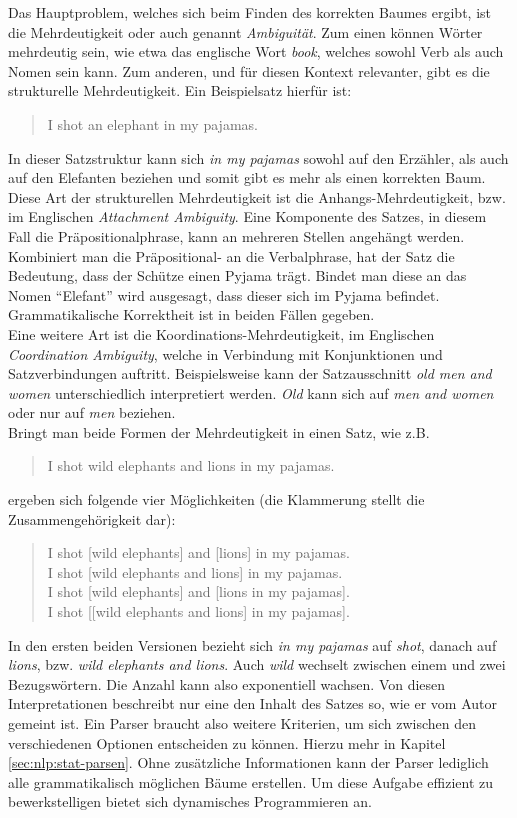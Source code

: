 Das Hauptproblem, welches sich beim Finden des korrekten Baumes ergibt, ist die Mehrdeutigkeit oder auch genannt \textit{Ambiguität}. Zum einen können Wörter mehrdeutig sein, wie etwa das englische Wort \textit{book}, welches sowohl Verb als auch Nomen sein kann. Zum anderen, und für diesen Kontext relevanter, gibt es die strukturelle Mehrdeutigkeit. Ein Beispielsatz hierfür ist: 
\begin{quote}
I shot an elephant in my pajamas.
\end{quote}
In dieser Satzstruktur kann sich \textit{in my pajamas} sowohl auf den Erzähler, als auch auf den Elefanten beziehen und somit gibt es mehr als einen korrekten Baum. \\ 
Diese Art der strukturellen Mehrdeutigkeit ist die Anhangs-Mehrdeutigkeit, bzw. im Englischen \textit{Attachment Ambiguity}. Eine Komponente des Satzes, in diesem Fall die Präpositionalphrase, kann an mehreren Stellen angehängt werden. Kombiniert man die Präpositional- an die Verbalphrase, hat der Satz die Bedeutung, dass der Schütze einen Pyjama trägt. Bindet man diese an das Nomen ``Elefant'' wird ausgesagt, dass dieser sich im Pyjama befindet. Grammatikalische Korrektheit ist in beiden Fällen gegeben. \\
Eine weitere Art ist die Koordinations-Mehrdeutigkeit, im Englischen \textit{Coordination Ambiguity}, welche in Verbindung mit Konjunktionen und Satzverbindungen auftritt. Beispielsweise kann der Satzausschnitt \textit{old men and women} unterschiedlich interpretiert werden. \textit{Old} kann sich auf \textit{men and women} oder nur auf \textit{men} beziehen. \\
Bringt man beide Formen der Mehrdeutigkeit in einen Satz, wie z.B. 
\begin{quote}
I shot wild elephants and lions in my pajamas.
\end{quote}
ergeben sich folgende vier Möglichkeiten (die Klammerung stellt die Zusammengehörigkeit dar): %
\begin{quote}
I shot [wild elephants] and [lions] in my pajamas.\\
I shot [wild elephants and lions] in my pajamas.\\
I shot [wild elephants] and [lions in my pajamas].\\
I shot [[wild elephants and lions] in my pajamas].\\
\end{quote}
In den ersten beiden Versionen bezieht sich \textit{in my pajamas} auf \textit{shot}, danach auf \textit{lions}, bzw. \textit{wild elephants and lions}. Auch \textit{wild} wechselt zwischen einem und zwei Bezugswörtern. Die Anzahl kann also exponentiell wachsen. %
Von diesen Interpretationen beschreibt nur eine den Inhalt des Satzes so, wie er vom Autor gemeint ist. Ein Parser braucht also weitere Kriterien, um sich zwischen den verschiedenen Optionen entscheiden zu können. Hierzu mehr in Kapitel \ref{sec:nlp:stat-parsen}. Ohne zusätzliche Informationen kann der Parser lediglich alle grammatikalisch möglichen Bäume erstellen. Um diese Aufgabe effizient zu bewerkstelligen bietet sich dynamisches Programmieren an. 

